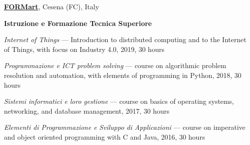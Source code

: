 \href{http://www.formart.it/}{\textbf{FORMart}}, Cesena (FC), Italy
\begin{outerlist}
\item[] \textbf{Istruzione e Formazione Tecnica Superiore}
    \begin{innerlist}
        \item \textit{Internet of Things} --- Introduction to distributed computing and to the Internet of Things, with focus on Industry 4.0, 2019, 30 hours
        \item \textit{Programmazione e ICT problem solving} --- course on algorithmic problem resolution and automation, with elements of programming in Python, 2018, 30 hours
        \item \textit{Sistemi informatici e loro gestione} --- course on basics of operating systems, networking, and database management, 2017, 30 hours
        \item \textit{Elementi di Programmazione e Sviluppo di Applicazioni} --- course on imperative and object oriented programming with C and Java, 2016, 30 hours
    \end{innerlist}
\halfblankline
\end{outerlist}
